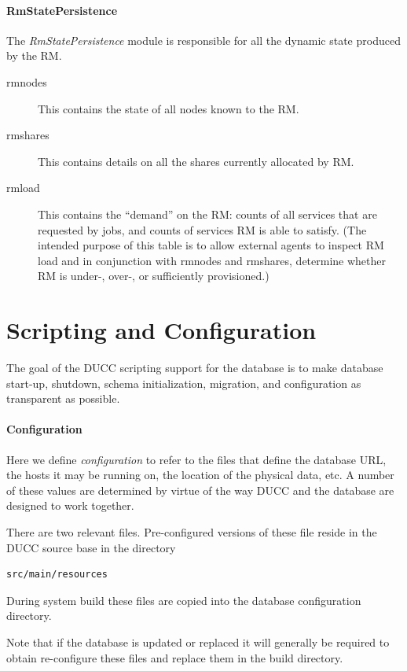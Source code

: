    \paragraph{RmStatePersistence} The {\em RmStatePersistence} module is responsible for all the
   dynamic state produced by the RM.

   \begin{description}
     \item[rmnodes] This contains the state of all nodes known to the RM.
     \item[rmshares] This contains details on all the shares currently allocated by RM.
     \item[rmload] This contains the ``demand'' on the RM: counts of all services that are 
       requested by jobs, and counts of services RM is able to satisfy. (The intended purpose
       of this table is to allow external agents to inspect RM load and in conjunction with
       rmnodes and rmshares, determine whether RM is under-, over-, or sufficiently provisioned.)
   \end{description}
   
\section{Scripting and Configuration}
    The goal of the DUCC scripting support for the database is to make database start-up, shutdown,
    schema initialization, migration, and configuration as transparent as possible.  

    \paragraph{Configuration} Here we define {\em configuration} to refer to the files 
    that define the database URL, the hosts it may be running on, the
    location of the physical data, etc.  A number of these values are determined
    by virtue of the way DUCC and the database are designed to work together.  

    There are two relevant files. Pre-configured versions of these file reside in the
    DUCC source base in the directory
\begin{verbatim}
src/main/resources
\end{verbatim}

    During system build these files are copied into the database configuration
    directory.

    Note that if the database is updated or replaced it will generally be required
    to  obtain re-configure these files and replace them in the build directory.

